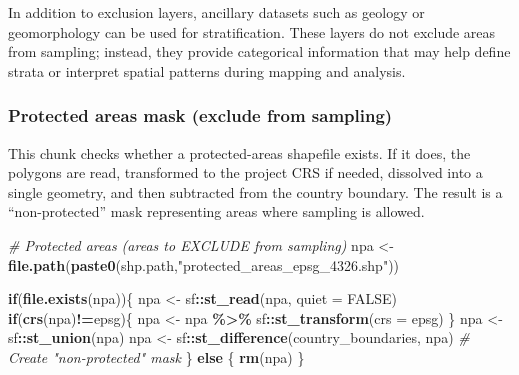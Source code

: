 \documentclass[
  10pt,
  b5paper,
  oneside]{book}
\newenvironment{Shaded}{\begin{snugshade}}{\end{snugshade}}
\newcommand{\AttributeTok}[1]{\textcolor[rgb]{0.13,0.29,0.53}{#1}}
\newcommand{\CommentTok}[1]{\textcolor[rgb]{0.56,0.35,0.01}{\textit{#1}}}
\newcommand{\ConstantTok}[1]{\textcolor[rgb]{0.56,0.35,0.01}{#1}}
\newcommand{\ControlFlowTok}[1]{\textcolor[rgb]{0.13,0.29,0.53}{\textbf{#1}}}
\newcommand{\FunctionTok}[1]{\textcolor[rgb]{0.13,0.29,0.53}{\textbf{#1}}}
\newcommand{\NormalTok}[1]{#1}
\newcommand{\OtherTok}[1]{\textcolor[rgb]{0.56,0.35,0.01}{#1}}
\newcommand{\SpecialCharTok}[1]{\textcolor[rgb]{0.81,0.36,0.00}{\textbf{#1}}}
\newcommand{\StringTok}[1]{\textcolor[rgb]{0.31,0.60,0.02}{#1}}
\begin{document}
In addition to exclusion layers, ancillary datasets such as geology or geomorphology can be used for stratification. These layers do not exclude areas from sampling; instead, they provide categorical information that may help define strata or interpret spatial patterns during mapping and analysis.

\subsubsection{Protected areas mask (exclude from sampling)}\label{protected-areas-mask-exclude-from-sampling}

This chunk checks whether a protected-areas shapefile exists. If it does, the polygons are read, transformed to the project CRS if needed, dissolved into a single geometry, and then subtracted from the country boundary. The result is a ``non-protected'' mask representing areas where sampling is allowed.

\begin{Shaded}
\begin{Highlighting}[]
\CommentTok{\# Protected areas (areas to EXCLUDE from sampling)}
\NormalTok{npa }\OtherTok{\textless{}{-}} \FunctionTok{file.path}\NormalTok{(}\FunctionTok{paste0}\NormalTok{(shp.path,}\StringTok{"protected\_areas\_epsg\_4326.shp"}\NormalTok{))}

\ControlFlowTok{if}\NormalTok{(}\FunctionTok{file.exists}\NormalTok{(npa))\{}
\NormalTok{  npa }\OtherTok{\textless{}{-}}\NormalTok{ sf}\SpecialCharTok{::}\FunctionTok{st\_read}\NormalTok{(npa, }\AttributeTok{quiet =} \ConstantTok{FALSE}\NormalTok{)}
  \ControlFlowTok{if}\NormalTok{(}\FunctionTok{crs}\NormalTok{(npa)}\SpecialCharTok{!=}\NormalTok{epsg)\{}
\NormalTok{    npa }\OtherTok{\textless{}{-}}\NormalTok{ npa }\SpecialCharTok{\%\textgreater{}\%}\NormalTok{ sf}\SpecialCharTok{::}\FunctionTok{st\_transform}\NormalTok{(}\AttributeTok{crs =}\NormalTok{ epsg)}
\NormalTok{  \}}
\NormalTok{  npa }\OtherTok{\textless{}{-}}\NormalTok{ sf}\SpecialCharTok{::}\FunctionTok{st\_union}\NormalTok{(npa)}
\NormalTok{  npa }\OtherTok{\textless{}{-}}\NormalTok{ sf}\SpecialCharTok{::}\FunctionTok{st\_difference}\NormalTok{(country\_boundaries, npa)  }\CommentTok{\# Create "non{-}protected" mask}
\NormalTok{\} }\ControlFlowTok{else}\NormalTok{ \{}
  \FunctionTok{rm}\NormalTok{(npa)}
\NormalTok{\}}
\end{Highlighting}
\end{Shaded}
\end{document}
